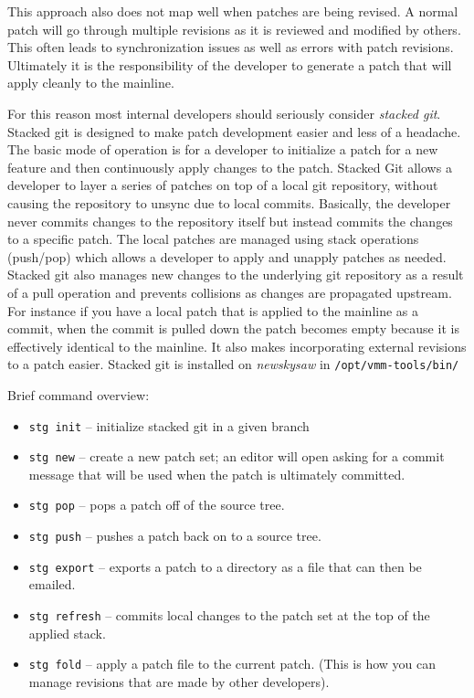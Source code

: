 \documentclass[11pt]{article}
\begin{document}
This approach also does not map well when patches are being revised. A
normal patch will go through multiple revisions as it is reviewed and
modified by others. This often leads to synchronization issues as well
as errors with patch revisions. Ultimately it is the responsibility of
the developer to generate a patch that will apply cleanly to the
mainline.

For this reason most internal developers should seriously consider
{\em stacked git}. Stacked git is designed to make patch development
easier and less of a headache. The basic mode of operation is for a
developer to initialize a patch for a new feature and then continuously
apply changes to the patch. Stacked Git allows a developer to layer a
series of patches on top of a local git repository, without causing
the repository to unsync due to local commits. Basically, the
developer never commits changes to the repository itself but instead
commits the changes to a specific patch. The local patches are managed
using stack operations (push/pop) which allows a developer to apply
and unapply patches as needed. Stacked git also manages new changes to
the underlying git repository as a result of a pull operation and
prevents collisions as changes are propagated upstream. For instance
if you have a local patch that is applied to the mainline as a commit,
when the commit is pulled down the patch becomes empty because it is
effectively identical to the mainline. It also makes incorporating
external revisions to a patch easier. Stacked git is installed on {\em
newskysaw} in \verb./opt/vmm-tools/bin/. 

Brief command overview:
\begin{itemize}
\item \verb.stg init. -- initialize stacked git in a given branch
\item \verb.stg new. -- create a new patch set; an editor will open
asking for a commit message that will be used when the patch is
ultimately committed.
\item \verb.stg pop. -- pops a patch off of the source tree.
\item \verb.stg push. -- pushes a patch back on to a source tree.
\item \verb.stg export. -- exports a patch to a directory as a file
that can then be emailed.
\item \verb.stg refresh. -- commits local changes to the patch set at
the top of the applied stack.
\item \verb.stg fold. -- apply a patch file to the current
patch. (This is how you can manage revisions that are made by other developers).
\end{itemize}
\end{document}
